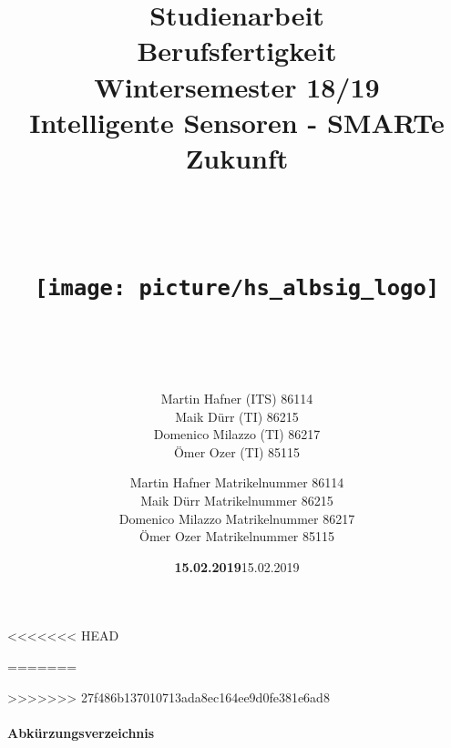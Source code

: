\documentclass[a4paper,12pt]{scrartcl}
\begin{document}
\title{Studienarbeit \vspace{20px} \hfill \\ Berufsfertigkeit\\ Wintersemester 18/19 \vspace{20px} \hfill \\  \vspace{50px} 
Intelligente Sensoren - SMARTe Zukunft \hfill \\ \hfill \\
\hfill \\ 
\begin{center}
\texttt{[image: picture/hs\_albsig\_logo]}
\end{center}
\hfill \\  \vspace{10px}
}


<<<<<<< HEAD
\author{Martin Hafner (ITS) 86114 \hfill \\
Maik Dürr (TI) 86215 \hfill \\
Domenico Milazzo (TI) 86217 \hfill \\
Ömer Ozer (TI) 85115 \hfill \\
}
\vspace{10px}
\date{\textbf{15.02.2019}}
=======
\author{Martin Hafner Matrikelnummer 86114 \hfill \\
Maik Dürr Matrikelnummer 86215 \hfill \\
Domenico Milazzo Matrikelnummer 86217 \hfill \\
Ömer Ozer Matrikelnummer 85115 \hfill \\}
\date{15.02.2019}
>>>>>>> 27f486b137010713ada8ec164ee9d0fe381e6ad8
\maketitle
\thispagestyle{empty}
\clearpage
\tableofcontents
\listoffigures
\listoftables
\paragraph{\Large{Abkürzungsverzeichnis}}
\begin{acronym}[Bash]
\end{acronym}
\onehalfspacing
\end{document}

